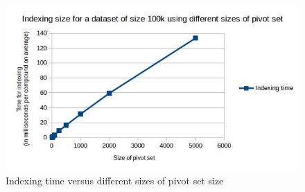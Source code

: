 \begin{figure}[ht]	
\centering
\includegraphics[width=1 \columnwidth]{img/image7.jpg}
\caption{Indexing time versus different sizes of pivot set size}
\label{fig:5.7}
\end{figure}



